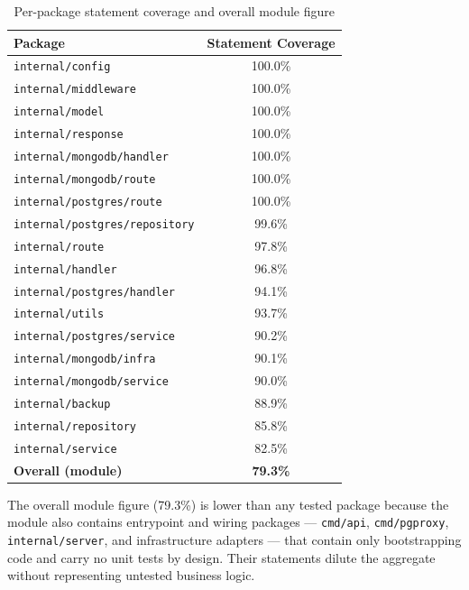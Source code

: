 \begin{table}[H]
    \centering
    \renewcommand{\arraystretch}{1.2}
    \begin{tabular}{lc}
    \toprule
    \textbf{Package} & \textbf{Statement Coverage} \\
    \midrule
    \texttt{internal/config}              & 100.0\% \\
    \texttt{internal/middleware}          & 100.0\% \\
    \texttt{internal/model}               & 100.0\% \\
    \texttt{internal/response}            & 100.0\% \\
    \texttt{internal/mongodb/handler}     & 100.0\% \\
    \texttt{internal/mongodb/route}       & 100.0\% \\
    \texttt{internal/postgres/route}      & 100.0\% \\
    \texttt{internal/postgres/repository} & 99.6\% \\
    \texttt{internal/route}               & 97.8\% \\
    \texttt{internal/handler}             & 96.8\% \\
    \texttt{internal/postgres/handler}    & 94.1\% \\
    \texttt{internal/utils}               & 93.7\% \\
    \texttt{internal/postgres/service}    & 90.2\% \\
    \texttt{internal/mongodb/infra}       & 90.1\% \\
    \texttt{internal/mongodb/service}     & 90.0\% \\
    \texttt{internal/backup}              & 88.9\% \\
    \texttt{internal/repository}          & 85.8\% \\
    \texttt{internal/service}             & 82.5\% \\
    \midrule
    \textbf{Overall (module)}             & \textbf{79.3\%} \\
    \bottomrule
    \end{tabular}
    \caption{Per-package statement coverage and overall module figure}
    \label{tab:coverage_results}
\end{table}

The overall module figure (79.3\%) is lower than any tested package because the module also contains entrypoint and wiring packages --- \texttt{cmd/api}, \texttt{cmd/pgproxy}, \texttt{internal/server}, and infrastructure adapters --- that contain only bootstrapping code and carry no unit tests by design. Their statements dilute the aggregate without representing untested business logic.

